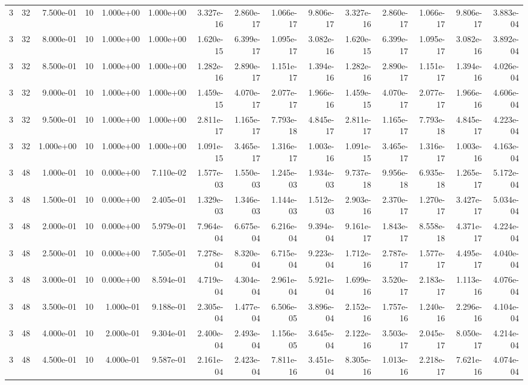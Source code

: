 \begin{tabular}{rrrrrrrrrrrrrrr}
3 & 32 & 7.500e-01 & 10 & 1.000e+00 & 1.000e+00 & 3.327e-16 & 2.860e-17 & 1.066e-17 & 9.806e-17 & 3.327e-16 & 2.860e-17 & 1.066e-17 & 9.806e-17 & 3.883e-04 \\
3 & 32 & 8.000e-01 & 10 & 1.000e+00 & 1.000e+00 & 1.620e-15 & 6.399e-17 & 1.095e-17 & 3.082e-16 & 1.620e-15 & 6.399e-17 & 1.095e-17 & 3.082e-16 & 3.892e-04 \\
3 & 32 & 8.500e-01 & 10 & 1.000e+00 & 1.000e+00 & 1.282e-16 & 2.890e-17 & 1.151e-17 & 1.394e-16 & 1.282e-16 & 2.890e-17 & 1.151e-17 & 1.394e-16 & 4.026e-04 \\
3 & 32 & 9.000e-01 & 10 & 1.000e+00 & 1.000e+00 & 1.459e-15 & 4.070e-17 & 2.077e-17 & 1.966e-16 & 1.459e-15 & 4.070e-17 & 2.077e-17 & 1.966e-16 & 4.606e-04 \\
3 & 32 & 9.500e-01 & 10 & 1.000e+00 & 1.000e+00 & 2.811e-17 & 1.165e-17 & 7.793e-18 & 4.845e-17 & 2.811e-17 & 1.165e-17 & 7.793e-18 & 4.845e-17 & 4.223e-04 \\
3 & 32 & 1.000e+00 & 10 & 1.000e+00 & 1.000e+00 & 1.091e-15 & 3.465e-17 & 1.316e-17 & 1.003e-16 & 1.091e-15 & 3.465e-17 & 1.316e-17 & 1.003e-16 & 4.163e-04 \\
3 & 48 & 1.000e-01 & 10 & 0.000e+00 & 7.110e-02 & 1.577e-03 & 1.550e-03 & 1.245e-03 & 1.934e-03 & 9.737e-18 & 9.956e-18 & 6.935e-18 & 1.265e-17 & 5.172e-04 \\
3 & 48 & 1.500e-01 & 10 & 0.000e+00 & 2.405e-01 & 1.329e-03 & 1.346e-03 & 1.144e-03 & 1.512e-03 & 2.903e-16 & 2.370e-17 & 1.270e-17 & 3.427e-17 & 5.034e-04 \\
3 & 48 & 2.000e-01 & 10 & 0.000e+00 & 5.979e-01 & 7.964e-04 & 6.675e-04 & 6.216e-04 & 9.394e-04 & 9.161e-17 & 1.843e-17 & 8.558e-18 & 4.371e-17 & 4.224e-04 \\
3 & 48 & 2.500e-01 & 10 & 0.000e+00 & 7.505e-01 & 7.278e-04 & 8.320e-04 & 6.715e-04 & 9.223e-04 & 1.712e-16 & 2.787e-17 & 1.577e-17 & 4.495e-17 & 4.040e-04 \\
3 & 48 & 3.000e-01 & 10 & 0.000e+00 & 8.594e-01 & 4.719e-04 & 4.304e-04 & 2.961e-04 & 5.921e-04 & 1.699e-16 & 3.520e-17 & 2.183e-17 & 1.113e-16 & 4.076e-04 \\
3 & 48 & 3.500e-01 & 10 & 1.000e-01 & 9.188e-01 & 2.305e-04 & 1.477e-04 & 6.506e-05 & 3.896e-04 & 2.152e-16 & 1.757e-16 & 1.240e-16 & 2.296e-16 & 4.104e-04 \\
3 & 48 & 4.000e-01 & 10 & 2.000e-01 & 9.304e-01 & 2.400e-04 & 2.493e-04 & 1.156e-05 & 3.645e-04 & 2.122e-16 & 3.503e-17 & 2.045e-17 & 8.050e-17 & 4.214e-04 \\
3 & 48 & 4.500e-01 & 10 & 4.000e-01 & 9.587e-01 & 2.161e-04 & 2.423e-04 & 7.811e-16 & 3.451e-04 & 8.305e-16 & 1.013e-16 & 2.218e-17 & 7.621e-16 & 4.074e-04 \\

\end{tabular}
